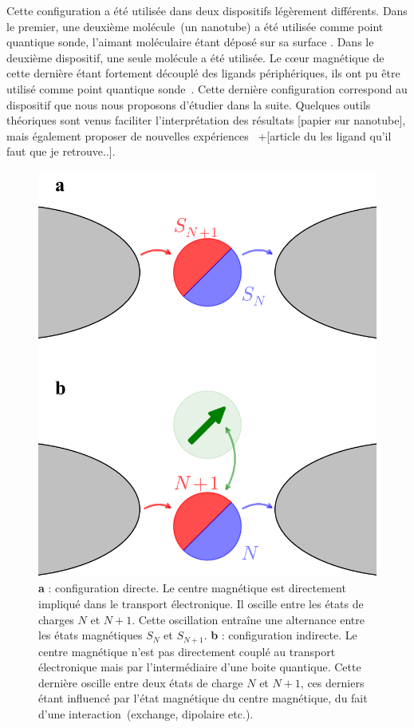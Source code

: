 Cette configuration a été utilisée dans deux dispositifs légèrement différents. Dans le premier, une deuxième molécule~(un nanotube) a été utilisée comme point quantique sonde, l'aimant moléculaire étant déposé sur sa surface \cite{Urdampilleta2011}. Dans le deuxième dispositif, une seule molécule a été utilisée. Le cœur magnétique de cette dernière étant fortement découplé des ligands périphériques, ils ont pu être utilisé comme point quantique sonde~\cite{Vincent2012}. Cette dernière configuration correspond au dispositif que nous nous proposons d'étudier dans la suite. Quelques outils théoriques sont venus faciliter l'interprétation des résultats [papier sur nanotube], mais également proposer de nouvelles expériences~\cite{Jaafar2010} +[article du les ligand qu'il faut que je retrouve..].


\begin{figure}
\parbox{6.5cm}{
\centering \includegraphics[scale=0.45]{Resultats/DirVsInd/DirVsInd.pdf} 
}
\parbox{7.5cm}{
\caption{\textbf{a} : configuration directe. Le centre magnétique est directement impliqué dans le transport électronique. Il oscille entre les états de charges $N$ et $N+1$. Cette oscillation entraîne une alternance entre les états magnétiques $S_{N}$ et $S_{N+1}$. \textbf{b} : configuration indirecte. Le centre magnétique n'est pas directement couplé au transport électronique mais par l'intermédiaire d'une boite quantique. Cette dernière oscille entre deux états de charge $N$ et $N+1$, ces derniers étant influencé par l'état magnétique du centre magnétique, du fait d'une interaction~(exchange, dipolaire etc.).}
\label{DirVsInd}
}
\end{figure}


